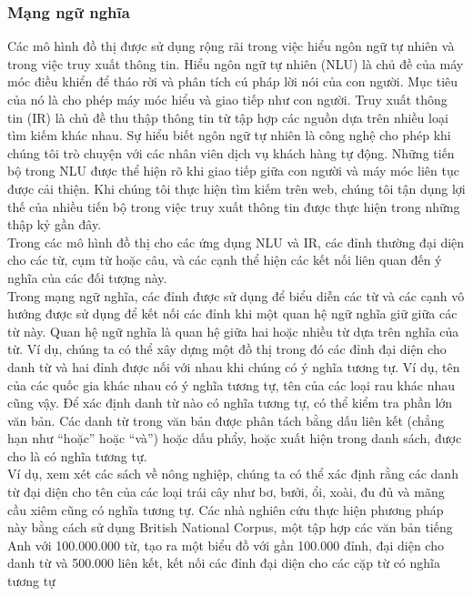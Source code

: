 \subsubsection{Mạng ngữ nghĩa}
Các mô hình đồ thị được sử dụng rộng rãi trong việc hiểu ngôn ngữ tự nhiên và trong việc truy xuất thông tin. Hiểu ngôn ngữ tự nhiên (NLU) là chủ đề của máy móc điều khiển để tháo rời và phân tích cú pháp lời nói của con người. Mục tiêu của nó là cho phép máy móc hiểu và giao tiếp như con người. Truy xuất thông tin (IR) là chủ đề thu thập thông tin từ tập hợp các nguồn dựa trên nhiều loại tìm kiếm khác nhau. Sự hiểu biết ngôn ngữ tự nhiên là công nghệ cho phép khi chúng tôi trò chuyện với các nhân viên dịch vụ khách hàng tự động. Những tiến bộ trong NLU được thể hiện rõ khi giao tiếp giữa con người và máy móc liên tục được cải thiện. Khi chúng tôi thực hiện tìm kiếm trên web, chúng tôi tận dụng lợi thế của nhiều tiến bộ trong việc truy xuất thông tin được thực hiện trong những thập kỷ gần đây.\\
Trong các mô hình đồ thị cho các ứng dụng NLU và IR, các đỉnh thường đại diện cho các từ, cụm từ hoặc câu, và các cạnh thể hiện các kết nối liên quan đến ý nghĩa của các đối tượng này.\\
Trong mạng ngữ nghĩa, các đỉnh được sử dụng để biểu diễn các từ và các cạnh vô hướng được sử dụng để kết nối các đỉnh khi một quan hệ ngữ nghĩa giữ giữa các từ này. Quan hệ ngữ nghĩa là quan hệ giữa hai hoặc nhiều từ dựa trên nghĩa của từ. Ví dụ, chúng ta có thể xây dựng một đồ thị trong đó các đỉnh đại diện cho danh từ và hai đỉnh được nối với nhau khi chúng có ý nghĩa tương tự. Ví dụ, tên của các quốc gia khác nhau có ý nghĩa tương tự, tên của các loại rau khác nhau cũng vậy. Để xác định danh từ nào có nghĩa tương tự, có thể kiểm tra phần lớn văn bản. Các danh từ trong văn bản được phân tách bằng dấu liên kết (chẳng hạn như “hoặc” hoặc “và”) hoặc dấu phẩy, hoặc xuất hiện trong danh sách, được cho là có nghĩa tương tự.\\
Ví dụ, xem xét các sách về nông nghiệp, chúng ta có thể xác định rằng các danh từ đại diện cho tên của các loại trái cây như bơ, bưởi, ổi, xoài, đu đủ và mãng cầu xiêm cũng có nghĩa tương tự. Các nhà nghiên cứu thực hiện phương pháp này bằng cách sử dụng British National Corpus, một tập hợp các văn bản tiếng Anh với 100.000.000 từ, tạo ra một biểu đồ với gần 100.000 đỉnh, đại diện cho danh từ và 500.000 liên kết, kết nối các đỉnh đại diện cho các cặp từ có nghĩa tương tự\\
